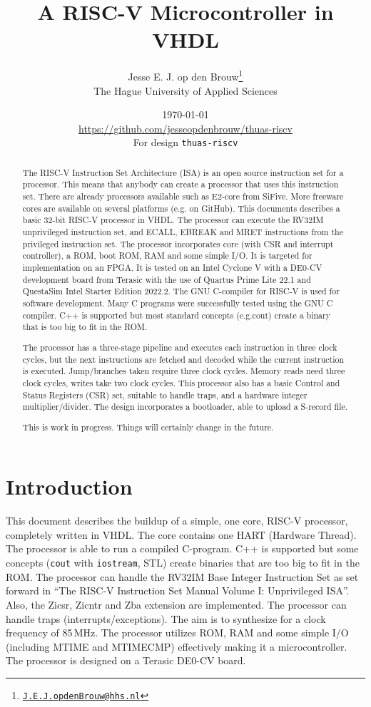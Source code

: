 \documentclass[12pt]{article}
\author{Jesse E. J. op den Brouw\thanks{\href{mailto:J.E.J.opdenBrouw@hhs.nl}{\texttt{J.E.J.opdenBrouw@hhs.nl}}}\\[2ex]The Hague University of Applied Sciences}
\title{A RISC-V Microcontroller in VHDL}
\date{\today\\[2ex]\normalsize\url{https://github.com/jesseopdenbrouw/thuas-riscv}\\[2ex]For design \texttt{thuas-riscv}}
\begin{document}
\maketitle

\vfill
\begin{abstract}
\baselineskip
\noindent
The RISC-V Instruction Set Architecture (ISA) is an open source instruction set for a processor. This means that anybody can create a processor that uses this instruction set. There are already processors available such as E2-core from SiFive. More freeware cores are available on several platforms (e.g. on GitHub). This documents describes a basic 32-bit RISC-V processor in VHDL. The processor can execute the RV32IM unprivileged instruction set, and ECALL, EBREAK and MRET instructions from the privileged instruction set. The processor incorporates core (with CSR and  interrupt controller), a ROM, boot ROM, RAM and some simple I/O. It is targeted for implementation on an FPGA. It is tested on an Intel Cyclone V with a DE0-CV development board from Terasic with the use of Quartus Prime Lite 22.1 and QuestaSim Intel Starter Edition 2022.2. The GNU C-compiler for RISC-V is used for software development. Many C programs were successfully tested using the GNU C compiler. C++ is supported but most standard concepts (e.g.\@ cout) create a binary that is too big to fit in the ROM.

\noindent
The processor has a three-stage pipeline and executes each instruction in three clock cycles, but the next instructions are fetched and decoded while the current instruction is executed. Jump/branches taken require three clock cycles. Memory reads need three clock cycles, writes take two clock cycles. This processor also has a basic Control and Status Registers (CSR) set, suitable to handle traps, and a hardware integer multiplier/divider. The design incorporates a bootloader, able to upload a S-record file.

\noindent
This is work in progress. Things will certainly change in the future.
\end{abstract}
\vfill

\clearpage
\tableofcontents

\clearpage
\section{Introduction}
This document describes the buildup of a simple, one core, RISC-V processor, completely written in VHDL. The core contains one HART (Hardware Thread). The processor is able to run a compiled C-program. C++ is supported but some concepts (\texttt{cout} with \texttt{iostream}, STL) create binaries that are too big to fit in the ROM. The processor can handle the RV32IM Base Integer Instruction Set as set forward in ``The RISC-V Instruction Set Manual Volume I: Unprivileged ISA''. Also, the Zicsr, Zicntr and Zba extension are implemented. The processor can handle traps (interrupts/exceptions). The aim is to synthesize for a clock frequency of 85\,MHz. The processor utilizes ROM, RAM and some simple I/O (including MTIME and MTIMECMP) effectively making it a microcontroller. The processor is designed on a Terasic DE0-CV board.
\end{document}
